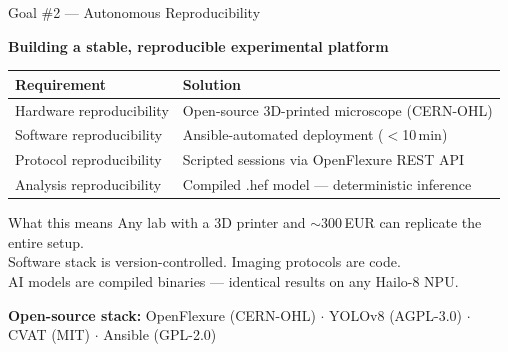 \documentclass[aspectratio=169,11pt]{beamer}
\begin{document}
\begin{frame}{Goal \#2 --- Autonomous Reproducibility}

  \textbf{Building a stable, reproducible experimental platform}

  \vspace{0.5em}

  \begin{tabular}{@{}ll@{}}
    \toprule
    \textbf{Requirement} & \textbf{Solution} \\
    \midrule
    Hardware reproducibility  & Open-source 3D-printed microscope (CERN-OHL) \\
    Software reproducibility  & Ansible-automated deployment ($<$10\,min) \\
    Protocol reproducibility  & Scripted sessions via OpenFlexure REST API \\
    Analysis reproducibility  & Compiled .hef model --- deterministic inference \\
    \bottomrule
  \end{tabular}

  \vspace{0.8em}

  \begin{block}{What this means}
    Any lab with a 3D printer and $\sim$300\,EUR can replicate the entire setup.\\
    Software stack is version-controlled. Imaging protocols are code.\\
    AI models are compiled binaries --- identical results on any Hailo-8 NPU.
  \end{block}

  \vfill
  \small
  \textbf{Open-source stack:}
  OpenFlexure (CERN-OHL) $\cdot$
  YOLOv8 (AGPL-3.0) $\cdot$
  CVAT (MIT) $\cdot$
  Ansible (GPL-2.0)

\end{frame}
\end{document}
